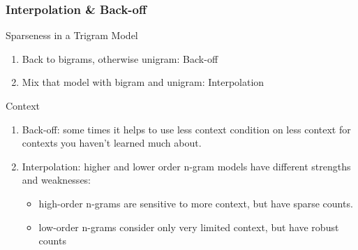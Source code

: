 \documentclass{beamer}
\begin{document}
\begin{frame}\frametitle{Interpolation \& Back-off}

\begin{block}{Sparseness in a Trigram Model}

\begin{enumerate}
\item Back to bigrams, otherwise unigram: \alert{Back-off}
\item Mix that model with bigram and unigram: \alert{Interpolation} 
\end{enumerate}

\end{block}


\begin{block}{Context}
\begin{enumerate}
\item \alert{Back-off}: 
some times it helps to use less
context condition on less context for contexts
you haven't learned much about.

\item \alert{Interpolation}: 
higher and lower order n-gram models have different strengths and weaknesses:
\begin{itemize}
\item high-order n-grams are sensitive to more context, but have sparse counts.
\item low-order n-grams consider only very limited context, but have robust counts
\end{itemize}
\end{enumerate}

\end{block}


\end{frame}
\end{document}
